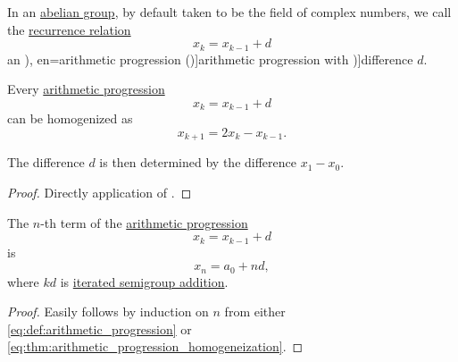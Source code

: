 \begin{definition}\label{def:arithmetic_progression}
  In an \hyperref[def:abelian_group]{abelian group}, by default taken to be the field of complex numbers, we call the \hyperref[def:recurrence_relation]{recurrence relation}
  \begin{equation}\label{eq:def:arithmetic_progression}
    x_k = x_{k-1} + d
  \end{equation}
  an \term[ru=арифметическая прогрессия (\cite[143]{АлександровМаркушевичХинчин1952ЭнциклопедияТом3}), en=arithmetic progression (\cite[def. 2.4.3]{Rosen2019DiscreteMathematics})]{arithmetic progression} with \term[en=common difference (\cite[def. 2.4.3]{Rosen2019DiscreteMathematics})]{difference} \( d \).
\end{definition}

\begin{proposition}\label{thm:arithmetic_progression_homogeneization}
  Every \hyperref[def:arithmetic_progression]{arithmetic progression}
  \begin{equation*}
    x_k = x_{k-1} + d
  \end{equation*}
  can be homogenized as
  \begin{equation}\label{eq:thm:arithmetic_progression_homogeneization}
    x_{k+1} = 2 x_k - x_{k-1}.
  \end{equation}
\end{proposition}
\begin{comments}
  \item The difference \( d \) is then determined by the difference \( x_1 - x_0 \).
\end{comments}
\begin{proof}
  Directly application of .
\end{proof}

\begin{proposition}\label{thm:arithmetic_progression_common_term}
  The \( n \)-th term of the \hyperref[def:arithmetic_progression]{arithmetic progression}
  \begin{equation*}
    x_k = x_{k-1} + d
  \end{equation*}
  is
  \begin{equation*}
    x_n = a_0 + nd,
  \end{equation*}
  where \( kd \) is \hyperref[con:additive_semigroup/multiplication]{iterated semigroup addition}.
\end{proposition}
\begin{proof}
  Easily follows by induction on \( n \) from either \eqref{eq:def:arithmetic_progression} or \eqref{eq:thm:arithmetic_progression_homogeneization}.
\end{proof}

